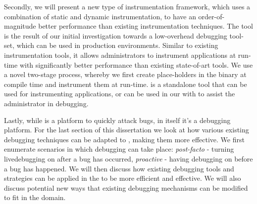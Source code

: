 Secondly, we will present \iprobe a new type of instrumentation framework, which uses a combination of static and dynamic instrumentation, to have an order-of-magnitude better performance than existing instrumentation techniques. 
The \iprobe tool is the result of our initial investigation towards a low-overhead debugging tool-set, which can be used in production environments.
Similar to existing instrumentation tools, it allows administrators to instrument applications at run-time with significantly better performance than existing state-of-art tools.
We use a novel two-stage process, whereby we first create place-holders in the binary at compile time and instrument them at run-time.
\iprobe is a standalone tool that can be used for instrumenting applications, or can be used in our \debugcontainer with \parikshan to assist the administrator in debugging.


\begin{comment}
Thirdly, we will present a mechanism to create overhead budgets for instrumentation in the debug container to make \livedebugging more robust, and longer lasting.
This will be split in two different kinds of techniques: Firstly, we will provide pro-active mechanism to find an instrumentation overhead budget. This is based on queuing theory, simulations, and testing results. 
Secondly: we will provide a reactive mechanism to modify instrumentation overhead. 
We will use the buffer size and usage as a trigger and present novel sampling techniques together with statistical testing mechanism to effectively isolate bugs.
\end{comment}

Lastly, while \parikshan is a platform to quickly attack bugs, in itself it's a debugging platform. 
For the last section of this dissertation we look at how various existing debugging techniques can be adapted to \livedebugging, making them more effective. 
We first enumerate scenarios in which debugging can take place: \emph{post-facto} - turning livedebugging on after a bug has occurred, \emph{proactive} - having debugging on before a bug has happened.
We will then discuss how existing debugging tools and strategies can be applied in the \debugcontainer to be more efficient and effective. We will also discuss potential new ways that existing debugging mechanisms can be modified to fit in the \livedebugging domain.



